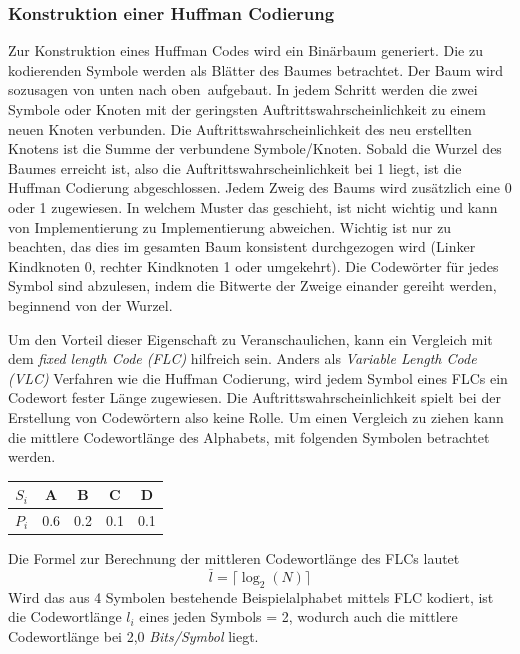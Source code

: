 \subsubsection{Konstruktion einer Huffman Codierung}
\label{subsubsec:konstruktion_huffman}
Zur Konstruktion eines Huffman Codes wird ein Binärbaum generiert.
Die zu kodierenden Symbole werden als Blätter des Baumes betrachtet.
Der Baum wird sozusagen von \glqq unten nach oben\grqq\ aufgebaut.
In jedem Schritt werden die zwei Symbole oder Knoten mit der geringsten Auftrittswahrscheinlichkeit zu einem neuen Knoten verbunden.
Die Auftrittswahrscheinlichkeit des neu erstellten Knotens ist die Summe der verbundene Symbole/Knoten.
Sobald die Wurzel des Baumes erreicht ist, also die Auftrittswahrscheinlichkeit bei 1 liegt, ist die Huffman Codierung abgeschlossen.
Jedem Zweig des Baums wird zusätzlich eine 0 oder 1 zugewiesen.
In welchem Muster das geschieht, ist nicht wichtig und kann von Implementierung zu Implementierung abweichen.
Wichtig ist nur zu beachten, das dies im gesamten Baum konsistent durchgezogen wird (Linker Kindknoten 0, rechter Kindknoten 1 oder umgekehrt).
Die Codewörter für jedes Symbol sind abzulesen, indem die Bitwerte der Zweige einander gereiht werden, beginnend von der Wurzel.

Um den Vorteil dieser Eigenschaft zu Veranschaulichen, kann ein Vergleich mit dem \textit{fixed length Code (FLC)} hilfreich sein.
Anders als \textit{Variable Length Code (VLC)} Verfahren wie die Huffman Codierung, wird jedem Symbol eines FLCs ein Codewort fester Länge zugewiesen.
Die Auftrittswahrscheinlichkeit spielt bei der Erstellung von Codewörtern also keine Rolle.
Um einen Vergleich zu ziehen kann die mittlere Codewortlänge des Alphabets, mit folgenden Symbolen betrachtet werden.

\begin{table}[h]
\centering
\begin{tabular}{ccccc}
\toprule
\textbf{\textit{\(S_i\)}} & {A} & {B} & {C} & {D} \\
\midrule
\textbf{\textit{\(P_i\)}} & 0.6 & 0.2 & 0.1 & 0.1\\
\bottomrule
\end{tabular}
\end{table}

Die Formel zur Berechnung der mittleren Codewortlänge des FLCs lautet
\begin{equation*}
\bar{l} = \lceil \log_2(N) \rceil
\end{equation*}
Wird das aus 4 Symbolen bestehende Beispielalphabet mittels FLC kodiert, ist die Codewortlänge \(l_i\) eines jeden Symbols = 2, wodurch auch die mittlere Codewortlänge bei 2,0 \textit{Bits/Symbol} liegt.

